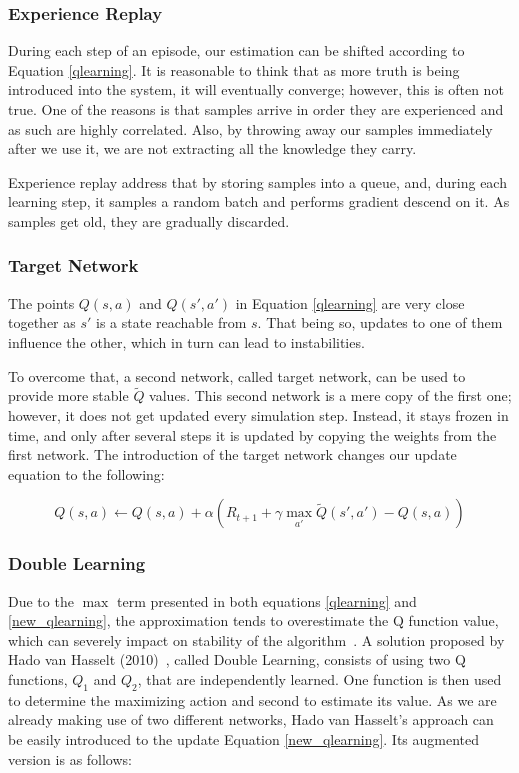 \documentclass[11pt,twoside]{article}
\begin{document}
\subsubsection{Experience Replay}\label{experience}

During each step of an episode, our estimation can be shifted according to Equation \ref{qlearning}. It is reasonable to think that as more truth is being introduced into the system, it will eventually converge; however, this is often not true. One of the reasons is that samples arrive in order they are experienced and as such are highly correlated. Also, by throwing away our samples immediately after we use it, we are not extracting all the knowledge they carry.

Experience replay address that by storing samples into a queue, and, during each learning step, it samples a random batch and performs gradient descend on it. As samples get old, they are gradually discarded.

\subsubsection{Target Network}

The points $Q(s, a)$ and $Q(s', a')$ in Equation \ref{qlearning} are very close together as $s'$ is a state reachable from $s$. That being so, updates to one of them influence the other, which in turn can lead to instabilities.

To overcome that, a second network, called target network, can be used to provide more stable $\widetilde{Q}$ values. This second network is a mere copy of the first one; however, it does not get updated every simulation step. Instead, it stays frozen in time, and only after several steps it is updated by copying the weights from the first network. The introduction of the target network changes our update equation to the following:

\begin{equation} \label{new_qlearning}
	Q(s, a) \leftarrow Q(s, a) + \alpha (R_{t+1} + \gamma \max_{a'}\widetilde{Q}(s', a') - Q(s,a))
\end{equation}

\subsubsection{Double Learning}\label{double_learning}

Due to the $\max$ term presented in both equations \ref{qlearning} and \ref{new_qlearning}, the approximation tends to overestimate the Q function value, which can severely impact on stability of the algorithm~\cite{overestimation}. A solution proposed by Hado van Hasselt (2010)~\cite{doubleq2010}, called Double Learning, consists of using two Q functions, $Q_1$ and $Q_2$, that are independently learned. One function is then used to determine the maximizing action and second to estimate its value. As we are already making use of two different networks, Hado van Hasselt's approach can be easily introduced to the update Equation \ref{new_qlearning}. Its augmented version is as follows:
\end{document}
